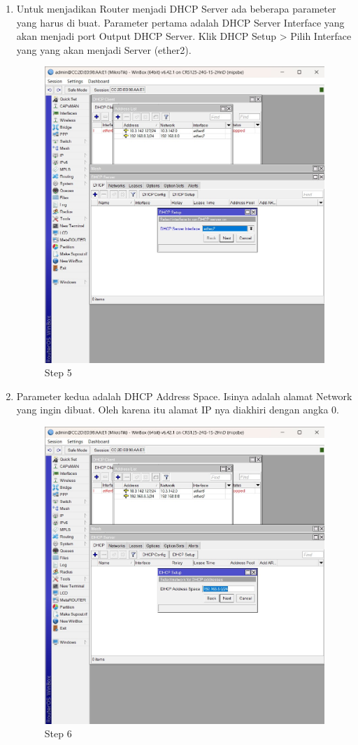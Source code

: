 \begin{enumerate}
	\item Untuk menjadikan Router menjadi DHCP Server ada beberapa parameter yang harus di buat.
	Parameter pertama adalah DHCP Server Interface yang akan menjadi port Output DHCP Server. Klik DHCP Setup > Pilih Interface yang yang akan menjadi Server (ether2).	
	\begin{figure}[H]
		\centering
		\includegraphics[width=0.5\linewidth]{P3/img/step5.jpg}
		\caption{Step 5}
		\label{fig:gambar4}
	\end{figure}

	\item Parameter kedua adalah DHCP Address Space. Isinya adalah alamat Network yang ingin dibuat. Oleh karena itu alamat IP nya diakhiri dengan angka 0.
	\begin{figure}[H]
		\centering
		\includegraphics[width=0.5\linewidth]{P3/img/step6.jpg}
		\caption{Step 6}
		\label{fig:gambar4}
	\end{figure}


\end{enumerate}
